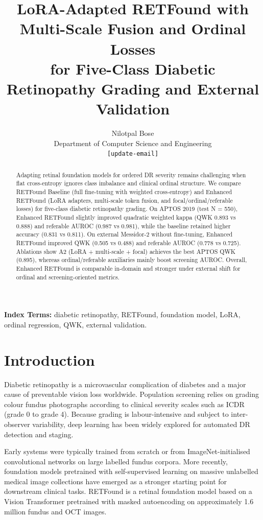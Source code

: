 \documentclass[10pt,twocolumn]{article}
\title{LoRA-Adapted RETFound with Multi-Scale Fusion and Ordinal Losses\\for Five-Class Diabetic Retinopathy Grading and External Validation}
\author{
Nilotpal Bose\\
Department of Computer Science and Engineering\\
\texttt{[update-email]}
}
\date{}
\begin{document}
\maketitle

\begin{abstract}
Adapting retinal foundation models for ordered DR severity remains challenging when flat cross-entropy ignores class imbalance and clinical ordinal structure. We compare RETFound Baseline (full fine-tuning with weighted cross-entropy) and Enhanced RETFound (LoRA adapters, multi-scale token fusion, and focal/ordinal/referable losses) for five-class diabetic retinopathy grading. On APTOS 2019 (test N = 550), Enhanced RETFound slightly improved quadratic weighted kappa (QWK 0.893 vs 0.888) and referable AUROC (0.987 vs 0.981), while the baseline retained higher accuracy (0.831 vs 0.811). On external Messidor-2 without fine-tuning, Enhanced RETFound improved QWK (0.505 vs 0.488) and referable AUROC (0.778 vs 0.725). Ablations show A2 (LoRA + multi-scale + focal) achieves the best APTOS QWK (0.895), whereas ordinal/referable auxiliaries mainly boost screening AUROC. Overall, Enhanced RETFound is comparable in-domain and stronger under external shift for ordinal and screening-oriented metrics.
\end{abstract}

\noindent\textbf{Index Terms:} diabetic retinopathy, RETFound, foundation model, LoRA, ordinal regression, QWK, external validation.

\section{Introduction}
Diabetic retinopathy is a microvascular complication of diabetes and a major cause of preventable vision loss worldwide. Population screening relies on grading colour fundus photographs according to clinical severity scales such as ICDR (grade 0 to grade 4). Because grading is labour-intensive and subject to inter-observer variability, deep learning has been widely explored for automated DR detection and staging.

Early systems were typically trained from scratch or from ImageNet-initialised convolutional networks on large labelled fundus corpora. More recently, foundation models pretrained with self-supervised learning on massive unlabelled medical image collections have emerged as a stronger starting point for downstream clinical tasks. RETFound is a retinal foundation model based on a Vision Transformer pretrained with masked autoencoding on approximately 1.6 million fundus and OCT images.
\end{document}
